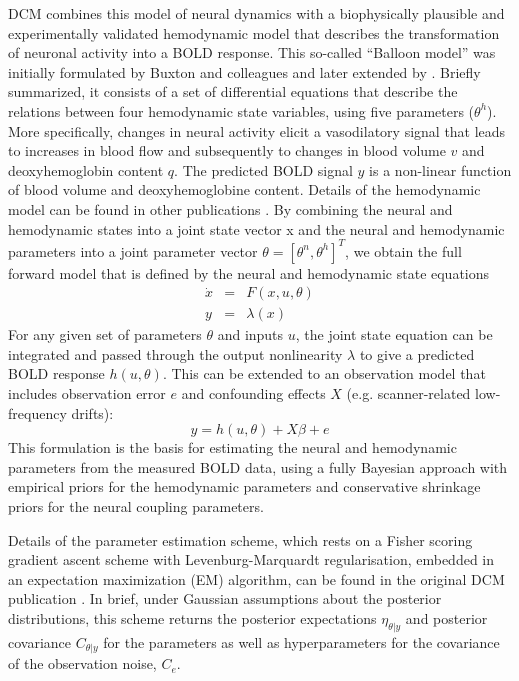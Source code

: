 DCM combines this model of neural dynamics with a biophysically plausible and experimentally validated hemodynamic model that describes the transformation of neuronal activity into a BOLD response.  This so-called ``Balloon model'' was initially formulated by Buxton and colleagues and later extended by \cite{balloon}.  Briefly summarized, it consists of a set of differential equations that describe the relations between four hemodynamic state variables, using five parameters ($\theta^h$).  More specifically, changes in neural activity elicit a vasodilatory signal that leads to increases in blood flow and subsequently to changes in blood volume $v$ and deoxyhemoglobin content $q$.  The predicted BOLD signal $y$ is a non-linear function of blood volume and deoxyhemoglobine content. Details of the hemodynamic model can be found in other publications \cite{balloon}.
By combining the neural and hemodynamic states into a joint state vector x and the neural and hemodynamic parameters into a joint parameter vector $\theta=[\theta^n, \theta^h]^T$, we obtain the full forward model that is defined by the neural and hemodynamic state equations
\begin{eqnarray}
\dot{x} & = & F(x,u,\theta) \\ \nonumber
y & = & \lambda(x)
\end{eqnarray}
For any given set of parameters $\theta$ and inputs $u$, the joint state equation can be integrated and passed through the output nonlinearity $\lambda$ to give a predicted BOLD response $h(u,\theta)$.  This can be extended to an observation model that includes observation error $e$ and confounding effects $X$ (e.g. scanner-related low-frequency drifts):
\begin{equation}
y = h(u,\theta) + X \beta + e
\end{equation}
This formulation is the basis for estimating the neural and hemodynamic parameters from the measured BOLD data, using a fully Bayesian approach with empirical priors for the hemodynamic parameters and conservative shrinkage priors for the neural coupling parameters.

Details of the parameter estimation scheme, which rests on a Fisher scoring gradient ascent scheme with Levenburg-Marquardt regularisation, embedded in an expectation maximization (EM) algorithm, can be found in the original DCM publication \cite{dcm}.  In brief, under Gaussian assumptions about the posterior distributions, this scheme returns the posterior expectations $\eta_{\theta | y}$ and posterior covariance  $C_{\theta | y}$ for the parameters as well as hyperparameters for the covariance of the observation noise, $C_e$.

